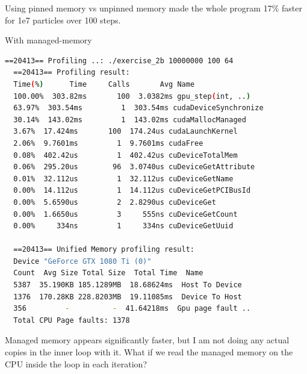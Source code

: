 \documentclass{article}
\begin{document}
Using pinned memory vs unpinned memory made the whole program 17\% faster for 1e7 particles over 100 steps.


\newpage

With managed-memory
\begin{mdframed}[backgroundcolor=codeColor,leftmargin=0.0cm,hidealllines=true,%
  innerleftmargin=0.1cm,innerrightmargin=0.1cm,innertopmargin=0.5cm,innerbottommargin=0.10cm,
  roundcorner=15pt]
  \begin{lstlisting}[language=bash]
  ==20413== Profiling ..: ./exercise_2b 10000000 100 64
  ==20413== Profiling result:
  Time(%)      Time     Calls       Avg Name
  100.00%  303.82ms       100  3.0382ms gpu_step(int, ..)
  63.97%  303.54ms         1  303.54ms cudaDeviceSynchronize
  30.14%  143.02ms         1  143.02ms cudaMallocManaged
  3.67%  17.424ms       100  174.24us cudaLaunchKernel
  2.06%  9.7601ms         1  9.7601ms cudaFree
  0.08%  402.42us         1  402.42us cuDeviceTotalMem
  0.06%  295.20us        96  3.0740us cuDeviceGetAttribute
  0.01%  32.112us         1  32.112us cuDeviceGetName
  0.00%  14.112us         1  14.112us cuDeviceGetPCIBusId
  0.00%  5.6590us         2  2.8290us cuDeviceGet
  0.00%  1.6650us         3     555ns cuDeviceGetCount
  0.00%     334ns         1     334ns cuDeviceGetUuid

  ==20413== Unified Memory profiling result:
  Device "GeForce GTX 1080 Ti (0)"
  Count  Avg Size Total Size  Total Time  Name
  5387  35.190KB 185.1289MB  18.68624ms  Host To Device
  1376  170.28KB 228.8203MB  19.11085ms  Device To Host
  356         -          -  41.64218ms  Gpu page fault ..
  Total CPU Page faults: 1378
  \end{lstlisting}
\end{mdframed}

Managed memory appears significantly faster, but I am not doing any actual copies in the inner loop with it. What if we read the managed memory on the CPU inside the loop in each iteration?

\newpage
\end{document}
